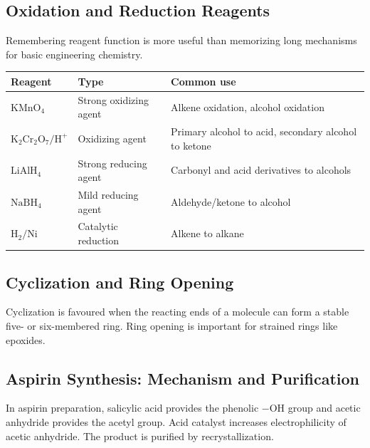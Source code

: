 \documentclass[12pt,a4paper]{article}
\begin{document}
\subsection{Oxidation and Reduction Reagents}
Remembering reagent function is more useful than memorizing long mechanisms for basic engineering chemistry.

\begin{tabularx}{\linewidth}{|B{3cm}|Y|Y|}
\hline
\textbf{Reagent} & \textbf{Type} & \textbf{Common use} \\
\hline
$\mathrm{KMnO_4}$ & Strong oxidizing agent & Alkene oxidation, alcohol oxidation \\
\hline
$\mathrm{K_2Cr_2O_7/H^+}$ & Oxidizing agent & Primary alcohol to acid, secondary alcohol to ketone \\
\hline
$\mathrm{LiAlH_4}$ & Strong reducing agent & Carbonyl and acid derivatives to alcohols \\
\hline
$\mathrm{NaBH_4}$ & Mild reducing agent & Aldehyde/ketone to alcohol \\
\hline
$\mathrm{H_2/Ni}$ & Catalytic reduction & Alkene to alkane \\
\hline
\end{tabularx}

\subsection{Cyclization and Ring Opening}
Cyclization is favoured when the reacting ends of a molecule can form a stable five- or six-membered ring. Ring opening is important for strained rings like epoxides.

\begin{tcolorbox}[tikzbox, title={Cyclization and Ring Opening Concept}]
\centering
{}
\end{tcolorbox}

\subsection{Aspirin Synthesis: Mechanism and Purification}
In aspirin preparation, salicylic acid provides the phenolic $-\mathrm{OH}$ group and acetic anhydride provides the acetyl group. Acid catalyst increases electrophilicity of acetic anhydride. The product is purified by recrystallization.
\end{document}
